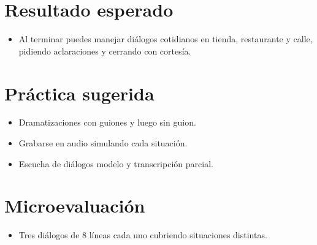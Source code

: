 \section{Resultado esperado}
\begin{itemize}[leftmargin=*]
	\item Al terminar puedes manejar diálogos cotidianos en tienda, restaurante y calle, pidiendo aclaraciones y cerrando con cortesía.
\end{itemize}

\section{Práctica sugerida}
\begin{itemize}[leftmargin=*]
	\item Dramatizaciones con guiones y luego sin guion.
	\item Grabarse en audio simulando cada situación.
	\item Escucha de diálogos modelo y transcripción parcial.
\end{itemize}

\section{Microevaluación}
\begin{itemize}[leftmargin=*]
	\item Tres diálogos de 8 líneas cada uno cubriendo situaciones distintas.
\end{itemize}
